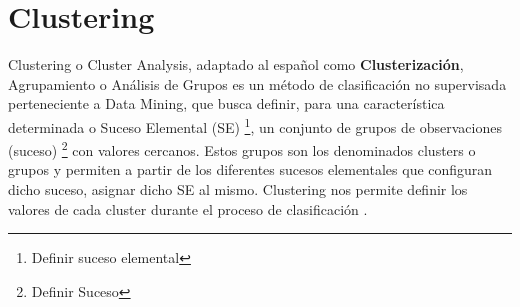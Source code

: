 \documentclass[3p,twocolumn]{elsarticle}
\begin{document}
\clearpage
\section{Clustering} 



Clustering o Cluster Analysis, adaptado al español como \textbf{Clusterización}, Agrupamiento o Análisis de Grupos es un método de clasificación no supervisada perteneciente a Data Mining, que busca definir, para una característica determinada o Suceso Elemental (SE) \footnote{Definir suceso elemental}, un conjunto de grupos de observaciones (suceso) \footnote{Definir Suceso} con valores cercanos. Estos grupos son los denominados clusters o grupos y permiten a partir de los diferentes sucesos elementales que configuran dicho suceso, asignar dicho SE al mismo. Clustering nos permite definir los valores de cada cluster durante el proceso de clasificación \cite{cita5}.




\newpage
\end{document}
